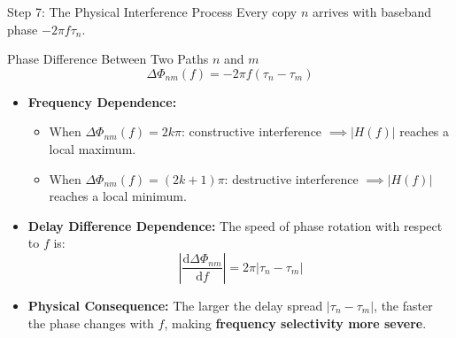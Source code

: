 \documentclass[10pt,aspectratio=169]{beamer}
\newcommand{\dd}{\mathrm{d}}
\begin{document}
\begin{frame}{Step 7: The Physical Interference Process}
  Every copy $n$ arrives with baseband phase $-2\pi f \tau_n$.

  \begin{block}{Phase Difference Between Two Paths $n$ and $m$}
    \begin{equation}
      \Delta\Phi_{nm}(f) = -2\pi f (\tau_n - \tau_m)
    \end{equation}
  \end{block}

  \begin{itemize}
    \setlength{\itemsep}{0.25cm}
    \item \textbf{Frequency Dependence:}
    \begin{itemize}
      \item When $\Delta\Phi_{nm}(f) = 2k\pi$: constructive interference $\implies |H(f)|$ reaches a local maximum.
      \item When $\Delta\Phi_{nm}(f) = (2k+1)\pi$: destructive interference $\implies |H(f)|$ reaches a local minimum.
    \end{itemize}
    \item \textbf{Delay Difference Dependence:} The speed of phase rotation with respect to $f$ is:
    \begin{equation}
      \left| \frac{\dd \Delta\Phi_{nm}}{\dd f} \right| = 2\pi |\tau_n - \tau_m|
    \end{equation}
    \item \textbf{Physical Consequence:} The larger the delay spread $|\tau_n - \tau_m|$, the faster the phase changes with $f$, making \textbf{frequency selectivity more severe}.
  \end{itemize}
\end{frame}
\end{document}
